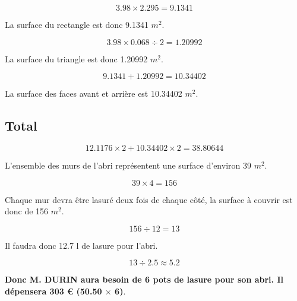 \documentclass[12pt,a4paper]{article}
\begin{document}
		\begin{equation*}
		\num{3.98} \times \num{2.295} = \num{9.1341}
		\end{equation*}
		
		La surface du rectangle est donc \num{9.1341} $m^2$.
		
		
		\begin{equation*}
		\num{3.98} \times \num{0.068} \div 2 = \num{1.20992}
		\end{equation*}
		
		La surface du triangle est donc \num{1.20992} $m^2$.
		
		\begin{equation*}
			\num{9.1341} + \num{1.20992} = \num{10.34402}
		\end{equation*}
		
		La surface des faces avant et arrière est \num{10.34402} $m^2$.
		
%			
%		
		
	\subsection*{Total}
	
		\begin{equation*}
			\num{12.1176} \times 2 + \num{10.34402} \times 2  = \num{38.80644}
		\end{equation*}
		
		L'ensemble des murs de l'abri représentent une surface d'environ 39 $m^2$.
		
		\begin{equation*}
			39 \times 4 = 156
		\end{equation*}
		
		Chaque mur devra être lasuré deux fois de chaque côté, la surface à couvrir est donc de 156 $m^2$.
		
		\begin{equation*}
			156 \div 12 = \num{13}
		\end{equation*}
		
		Il faudra donc \num{12,7} l de lasure pour l'abri.
			
		\begin{equation*}
			\num{13} \div \num{2.5} \approx \num{5.2} 
		\end{equation*}
		
		\textbf{Donc M. DURIN aura besoin de 6 pots de lasure pour son abri. Il dépensera 303 € (\num{50.50} $\times$ 6)}.
\end{document}

